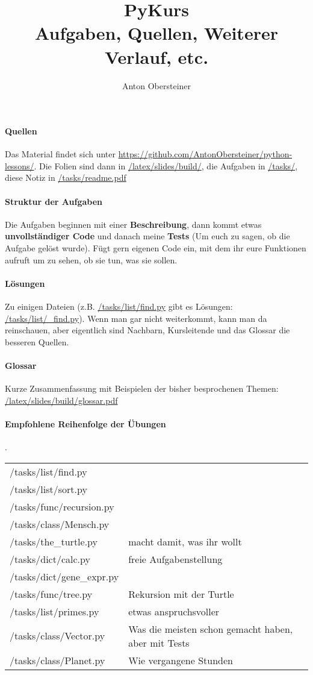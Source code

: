\documentclass{article}
\title{PyKurs \\ \normalsize Aufgaben, Quellen, Weiterer Verlauf, etc.}
\author{Anton Obersteiner}
\begin{document}
\maketitle
\paragraph{Quellen}
	Das Material findet sich unter \url{https://github.com/AntonObersteiner/python-lessons/}.
	Die Folien sind dann in \url{/latex/slides/build/}, die Aufgaben in \url{/tasks/}, diese Notiz in \url{/tasks/readme.pdf}

\paragraph{Struktur der Aufgaben}
	Die Aufgaben beginnen mit einer \textbf{Beschreibung}, dann kommt etwas \textbf{unvollständiger Code} und danach meine \textbf{Tests} (Um euch zu sagen, ob die Aufgabe gelöst wurde). Fügt gern eigenen Code ein, mit dem ihr eure Funktionen aufruft um zu sehen, ob sie tun, was sie sollen.
\paragraph{Lösungen}
	Zu einigen Dateien (z.B. \url{/tasks/list/find.py} gibt es Lösungen: \url{/tasks/list/_find.py}). Wenn man gar nicht weiterkommt, kann man da reinschauen, aber eigentlich sind Nachbarn, Kursleitende und das Glossar die besseren Quellen.

\paragraph{Glossar}
	Kurze Zusammenfassung mit Beispielen der bisher besprochenen Themen: \url{/latex/slides/build/glossar.pdf}

\paragraph{Empfohlene Reihenfolge der Übungen} .\\
	\begin{tabular}{l|l}
		/tasks/list/find.py \\
		/tasks/list/sort.py \\
		/tasks/func/recursion.py \\
		/tasks/class/Mensch.py \\
		/tasks/the\_turtle.py & macht damit, was ihr wollt \\
		/tasks/dict/calc.py & freie Aufgabenstellung \\
		/tasks/dict/gene\_expr.py \\
		/tasks/func/tree.py & Rekursion mit der Turtle \\
		/tasks/list/primes.py & etwas anspruchsvoller \\
		/tasks/class/Vector.py & Was die meisten schon gemacht haben, aber mit Tests \\
		/tasks/class/Planet.py & Wie vergangene Stunden \\
	\end{tabular}
\end{document}
